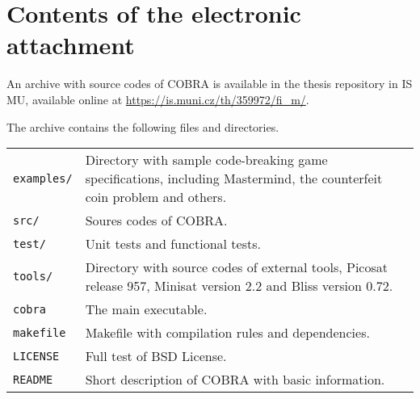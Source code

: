 \chapter*{Contents of the electronic attachment}

An archive with source codes of COBRA
is available in the thesis repository in IS MU,
available online at \url{https://is.muni.cz/th/359972/fi_m/}.

The archive contains the following files and directories.

\bigskip
\begin{tabularx}{\textwidth}{lX}
 \texttt{examples/}\hfill & Directory with sample code-breaking game specifications,
        including Mastermind, the counterfeit coin problem and others. \\
\texttt{src/} & Soures codes of COBRA. \\
\texttt{test/} & Unit tests and functional tests. \\
\texttt{tools/} & Directory with source codes of external tools, Picosat release 957, Minisat version 2.2 and Bliss version 0.72. \\
\texttt{cobra} & The main executable. \\
\texttt{makefile} & Makefile with compilation rules and dependencies. \\
\texttt{LICENSE} & Full test of BSD License. \\
\texttt{README} & Short description of COBRA with basic information. \\
\end{tabularx}
